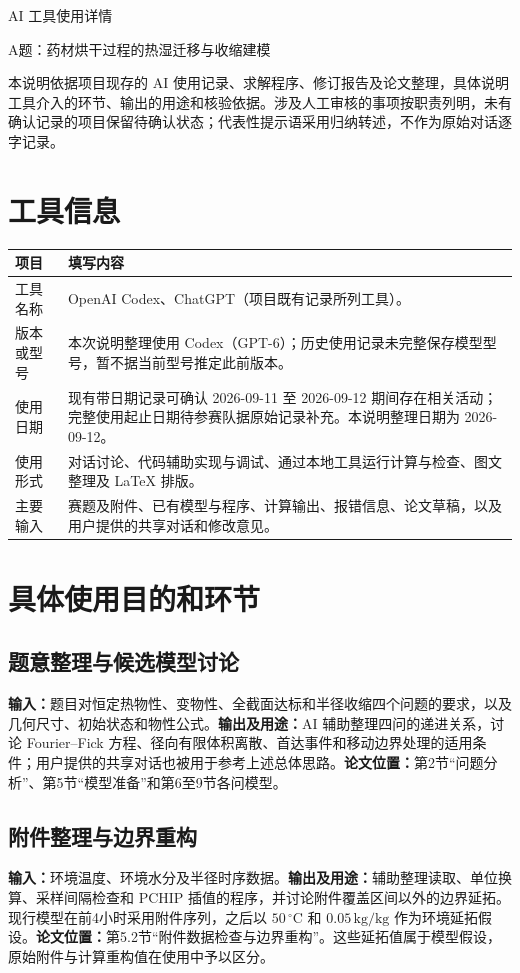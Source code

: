 \documentclass[UTF8,a4paper,12pt,fontset=windows]{ctexart}
\newcommand{\field}[1]{\textbf{#1：}}
\begin{document}
\begin{center}
  {\heiti{} AI 工具使用详情}\par
  \vspace{0.35em}
  {\small A题：药材烘干过程的热湿迁移与收缩建模}
\end{center}

本说明依据项目现存的 AI 使用记录、求解程序、修订报告及论文整理，具体说明工具介入的环节、输出的用途和核验依据。涉及人工审核的事项按职责列明，未有确认记录的项目保留待确认状态；代表性提示语采用归纳转述，不作为原始对话逐字记录。

\section{工具信息}
\renewcommand{\arraystretch}{1.25}
\noindent\begin{tabularx}{\textwidth}{@{}p{}Y@{}}
\toprule
项目 & 填写内容 \\
\midrule
工具名称 & OpenAI Codex、ChatGPT（项目既有记录所列工具）。\\
版本或型号 & 本次说明整理使用 Codex（GPT-6）；历史使用记录未完整保存模型型号，暂不据当前型号推定此前版本。\\
使用日期 & 现有带日期记录可确认 2026-09-11 至 2026-09-12 期间存在相关活动；完整使用起止日期待参赛队据原始记录补充。本说明整理日期为 2026-09-12。\\
使用形式 & 对话讨论、代码辅助实现与调试、通过本地工具运行计算与检查、图文整理及 LaTeX 排版。\\
主要输入 & 赛题及附件、已有模型与程序、计算输出、报错信息、论文草稿，以及用户提供的共享对话和修改意见。\\
\bottomrule
\end{tabularx}

\section{具体使用目的和环节}
\subsection{题意整理与候选模型讨论}
\field{输入}题目对恒定热物性、变物性、全截面达标和半径收缩四个问题的要求，以及几何尺寸、初始状态和物性公式。\field{输出及用途}AI 辅助整理四问的递进关系，讨论 Fourier--Fick 方程、径向有限体积离散、首达事件和移动边界处理的适用条件；用户提供的共享对话也被用于参考上述总体思路。\field{论文位置}第2节“问题分析”、第5节“模型准备”和第6至9节各问模型。

\subsection{附件整理与边界重构}
\field{输入}环境温度、环境水分及半径时序数据。\field{输出及用途}辅助整理读取、单位换算、采样间隔检查和 PCHIP 插值的程序，并讨论附件覆盖区间以外的边界延拓。现行模型在前4小时采用附件序列，之后以 $50\,{}^\circ\mathrm C$ 和 $0.05\,\mathrm{kg/kg}$ 作为环境延拓假设。\field{论文位置}第5.2节“附件数据检查与边界重构”。这些延拓值属于模型假设，原始附件与计算重构值在使用中予以区分。
\end{document}
